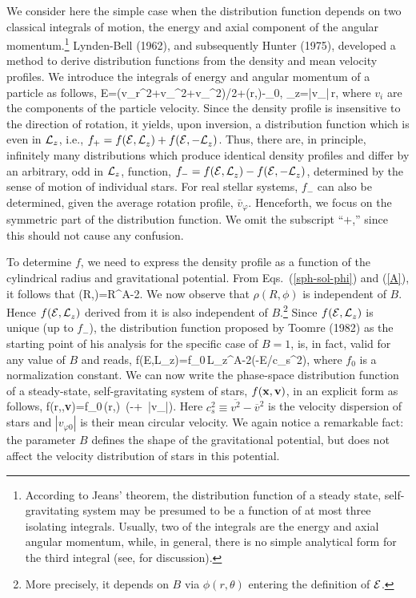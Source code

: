 We consider here the simple case when the distribution function 
depends on two classical integrals of motion,
the energy and axial component of the angular momentum.\footnote{
	According to Jeans' theorem, the distribution function of a steady
	state, self-gravitating system may be presumed to be a function of at
	most three isolating integrals. Usually, two of the integrals are the 
	energy and axial angular momentum, while, in general, there is no 
	simple analytical form for the third integral (see, \cite{BT} for 
	discussion). }
Lynden-Bell (1962), and subsequently Hunter (1975), developed a method to derive
distribution functions from the density and mean velocity profiles.
We introduce the integrals of energy and angular momentum of a particle as
follows,
\beq
{\cal E}=\left(v_r^2+v_\theta^2+v_\varphi^2\right)/2+\phi(r,\theta)-\phi_0, 
_z=\left|v_\varphi\right|\,r\sin\theta ,
\eeq
where $v_i$ are the components of the particle velocity. Since the density
profile is insensitive to the direction of rotation, it yields, upon inversion,
a distribution function which is even in ${\cal L}_z$, i.e., 
$f_+=f({\cal E,L}_z)+f({\cal E,-L}_z)$. Thus, there are, in principle, 
infinitely many distributions which produce identical density profiles
and differ by an arbitrary, odd in ${\cal L}_z$, function, 
$f_-=f({\cal E,L}_z)-f({\cal E,-L}_z)$, determined by the sense of motion of
individual stars. For real stellar systems, $f_-$ can also be determined, 
given the average rotation profile, $\bar v_\varphi$. Henceforth, we focus on
the symmetric part of the distribution function. We omit the subscript
``$+$,'' since this should not cause any confusion.

To determine $f$, we need to express the density profile as a function 
of the cylindrical radius and gravitational potential. 
From Eqs.\ (\ref{sph-sol-phi}) and (\ref{A}), it follows that
\beq
\rho(R,\phi)=R^{A-2}\exp{} .
\eeq
We now observe that $\rho(R,\phi)$ is independent of $B$. Hence 
$f({\cal E,L}_z)$ derived from it is also independent of $B$.\footnote{
	More precisely, it depends on $B$ via $\phi(r,\theta)$ entering 
	the definition of ${\cal E}$.}
Since $f({\cal E,L}_z)$ is unique (up to $f_-$), the distribution function
proposed by Toomre (1982) as the starting point of his analysis for
the specific case of $B=1$, is, in fact, valid for any value of $B$
and reads,
\beq
f({\cal E,L}_z)=f_0\,{\cal L}_z^{A-2}\exp\left(-{\cal E}/c_s^2\right),
\eeq
where $f_0$ is a normalization constant.
We can now write the phase-space distribution function of a steady-state,
self-gravitating system of stars, $f({\bf x,v})$, in an explicit form
as follows,
\beq
f(r,\theta,{\bf v})=f_0\,\rho(r,\theta)\,
\exp\!\left(-+
\,\ln\left|v_\varphi\right|\right).
\eeq
Here $c_s^2\equiv\overline{v^2}-\overline{v}^2$ is the velocity dispersion of
stars and $|v_{\varphi0}|$ is their mean circular velocity. We again notice a
remarkable fact: the parameter $B$ defines the shape of the
gravitational potential, but does not affect the velocity distribution of 
stars in this potential.


